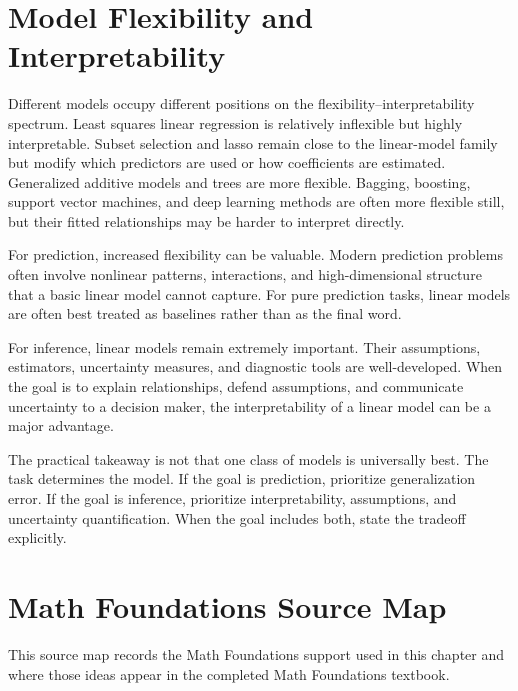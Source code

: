 {\section{Model Flexibility and Interpretability}

Different models occupy different positions on the flexibility--interpretability spectrum.  Least squares linear regression is relatively inflexible but highly interpretable.  Subset selection and lasso remain close to the linear-model family but modify which predictors are used or how coefficients are estimated.  Generalized additive models and trees are more flexible.  Bagging, boosting, support vector machines, and deep learning methods are often more flexible still, but their fitted relationships may be harder to interpret directly.

For prediction, increased flexibility can be valuable.  Modern prediction problems often involve nonlinear patterns, interactions, and high-dimensional structure that a basic linear model cannot capture.  For pure prediction tasks, linear models are often best treated as baselines rather than as the final word.

For inference, linear models remain extremely important.  Their assumptions, estimators, uncertainty measures, and diagnostic tools are well-developed.  When the goal is to explain relationships, defend assumptions, and communicate uncertainty to a decision maker, the interpretability of a linear model can be a major advantage.

The practical takeaway is not that one class of models is universally best.  The task determines the model.  If the goal is prediction, prioritize generalization error.  If the goal is inference, prioritize interpretability, assumptions, and uncertainty quantification.  When the goal includes both, state the tradeoff explicitly.

\section{Math Foundations Source Map}

This source map records the Math Foundations support used in this chapter and where those ideas appear in the completed Math Foundations textbook.

}
